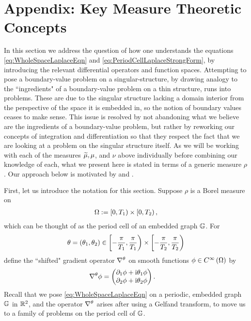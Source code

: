 \section{Appendix: Key Measure Theoretic Concepts} \label{app:MeasureTheory}
In this section we address the question of how one understands the equations \eqref{eq:WholeSpaceLaplaceEqn} and \eqref{eq:PeriodCellLaplaceStrongForm}, by introducing the relevant differential operators and function spaces.
Attempting to pose a boundary-value problem on a singular-structure, by drawing analogy to the ``ingredients" of a boundary-value problem on a thin structure, runs into problems.
These are due to the singular structure lacking a domain interior from the perspective of the space it is embedded in, so the notion of boundary values ceases to make sense.
This issue is resolved by not abandoning what we believe are the ingredients of a boundary-value problem, but rather by reworking our concepts of integration and differentiation so that they respect the fact that we are looking at a problem on the singular structure itself.
As we will be working with each of the measures $\widetilde{\mu}, \mu$, and $\nu$ above individually before combining our knowledge of each, what we present here is stated in terms of a generic measure $\rho$.
Our approach below is motivated by \cite{zhikov2000extension} and \cite{zhikov2002homogenization}.

First, let us introduce the notation for this section.
Suppose $\rho$ is a Borel measure on 
\begin{align*}
	\Omega:= \left[0,T_1\right)\times\left[0,T_2\right), 
\end{align*}
which can be thought of as the period cell of an embedded graph $\mathbb{G}$.
For 
\begin{align*}
	\theta=\left( \theta_1,\theta_2 \right)\in\left[-\frac{\pi}{T_1},\frac{\pi}{T_1}\right)\times\left[-\frac{\pi}{T_2},\frac{\pi}{T_2}\right)
\end{align*}
define the ``shifted" gradient operator $\nabla^{\theta}$ on smooth functions $\phi\in C^{\infty}\left( \Omega \right)$ by
\begin{align*}
	\nabla^{\theta}\phi &= \begin{pmatrix} \partial_1\phi + \mathrm{i}\theta_1\phi \\ \partial_2\phi + \mathrm{i}\theta_2\phi \end{pmatrix}.
\end{align*}
Recall that we pose \eqref{eq:WholeSpaceLaplaceEqn} on a periodic, embedded graph $\mathbb{G}$ in $\mathbb{R}^2$, and the operator $\nabla^{\theta}$ arises after using a Gelfand transform, to move us to a family of problems on the period cell of $\mathbb{G}$.

